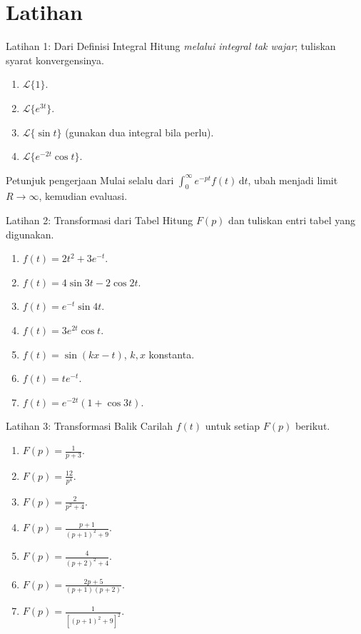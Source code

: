 \documentclass[aspectratio=169,11pt]{beamer}
\newcommand{\Lap}{\mathcal{L}}
\newcommand{\dd}{\,\mathrm{d}}
\begin{document}
\section{Latihan}
\begin{frame}{Latihan 1: Dari Definisi Integral}
\small Hitung \emph{melalui integral tak wajar}; tuliskan syarat konvergensinya.
\begin{enumerate}
\item $\displaystyle\Lap\{1\}$.
\item $\displaystyle\Lap\{e^{3t}\}$.
\item $\displaystyle\Lap\{\sin t\}$ (gunakan dua integral bila perlu).
\item $\displaystyle\Lap\{e^{-2t}\cos t\}$.
\end{enumerate}
\vspace{4mm}
\begin{block}{Petunjuk pengerjaan}
Mulai selalu dari $\int_0^\infty e^{-pt}f(t)\dd t$, ubah menjadi limit $R\to\infty$, kemudian evaluasi.
\end{block}
\end{frame}

\begin{frame}{Latihan 2: Transformasi dari Tabel}
\small Hitung $F(p)$ dan tuliskan entri tabel yang digunakan.
\begin{enumerate}
\item $f(t)=2t^2+3e^{-t}$.
\item $f(t)=4\sin3t-2\cos2t$.
\item $f(t)=e^{-t}\sin4t$.
\item $f(t)=3e^{2t}\cos t$.
\item $f(t)=\sin(kx-t)$, $k,x$ konstanta.
\item $f(t)=t e^{-t}$.
\item $f(t)=e^{-2t}(1+\cos3t)$.
\end{enumerate}
\end{frame}

\begin{frame}{Latihan 3: Transformasi Balik}
\small Carilah $f(t)$ untuk setiap $F(p)$ berikut.
\begin{enumerate}
\item $\displaystyle F(p)=\frac1{p+3}$.
\item $\displaystyle F(p)=\frac{12}{p^4}$.
\item $\displaystyle F(p)=\frac2{p^2+4}$.
\item $\displaystyle F(p)=\frac{p+1}{(p+1)^2+9}$.
\item $\displaystyle F(p)=\frac4{(p+2)^2+4}$.
\item $\displaystyle F(p)=\frac{2p+5}{(p+1)(p+2)}$.
\item $\displaystyle F(p)=\frac1{[(p+1)^2+9]^2}$.
\end{enumerate}
\end{frame}
\end{document}
